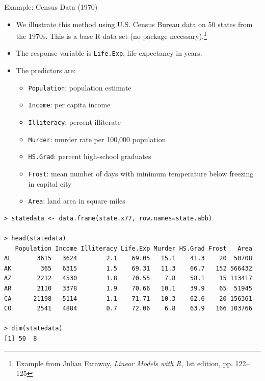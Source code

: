 \documentclass[10pt]{beamer}\usepackage[]{graphicx}\usepackage[]{color}
\begin{document}
\begin{frame}{Example: Census Data (1970)}
\begin{itemize}
\item We illustrate this method using U.S. Census Bureau data on 50 states from the 1970s.  This is a base R data set (no package necessary).\footnote{Example from Julian Faraway, \emph{Linear Models with R}, 1st edition, pp. 122--125}
\vspace{5pt}
\item The response variable is \texttt{Life.Exp}, life expectancy in years.
\vspace{5pt}
\item The predictors are:
\begin{itemize}
\item \texttt{Population}: population estimate
\item \texttt{Income}: per capita income
\item \texttt{Illiteracy}: percent illiterate
\item \texttt{Murder}: murder rate per 100,000 population
\item \texttt{HS.Grad}: percent high-school graduates
\item \texttt{Frost}: mean number of days with minimum temperature below freezing in capital city
\item \texttt{Area}: land area in square miles
\end{itemize}
\end{itemize}
\end{frame}

\begin{frame}[fragile]
\small
\scriptsize
\begin{verbatim}
> statedata <- data.frame(state.x77, row.names=state.abb)

> head(statedata)
   Population Income Illiteracy Life.Exp Murder HS.Grad Frost   Area
AL       3615   3624        2.1    69.05   15.1    41.3    20  50708
AK        365   6315        1.5    69.31   11.3    66.7   152 566432
AZ       2212   4530        1.8    70.55    7.8    58.1    15 113417
AR       2110   3378        1.9    70.66   10.1    39.9    65  51945
CA      21198   5114        1.1    71.71   10.3    62.6    20 156361
CO       2541   4884        0.7    72.06    6.8    63.9   166 103766

> dim(statedata)
[1] 50  8
\end{verbatim}
\end{frame}
\end{document}
